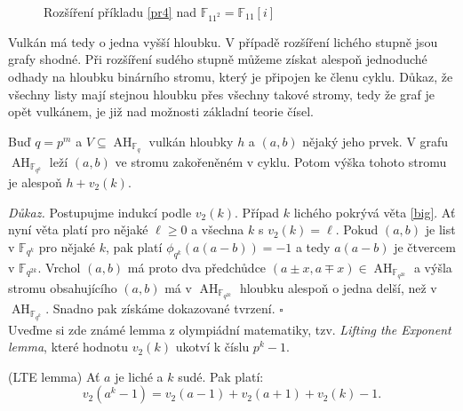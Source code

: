 \documentclass[12pt]{report}
\DeclareMathOperator{\AH}{AH}
\begin{document}
\begin{figure}[!h]
\begin{center}
\end{center}
\caption{Rozšíření příkladu \ref{pr4} nad $\mathbb{F}_{11^2} = \mathbb{F}_{11}[i]$}
\label{sus}
\end{figure}

Vulkán má tedy o jedna vyšší hloubku. V případě rozšíření lichého stupně jsou grafy shodné. Při rozšíření sudého stupně můžeme získat alespoň jednoduché odhady na hloubku binárního stromu, který je připojen ke členu cyklu. Důkaz, že všechny listy mají stejnou hloubku přes všechny takové stromy, tedy že graf je opět vulkánem, je již nad možnosti základní teorie čísel. 

\begin{dusledek}\label{hloub}
Buď $q = p^m$ a $V \subseteq \AH_{\mathbb{F}_q}$ vulkán hloubky $h$ a $(a,b)$ nějaký jeho prvek. V grafu $\AH_{\mathbb{F}_{q^k}}$ leží $(a,b)$ ve stromu zakořeněném v cyklu. Potom výška tohoto stromu je alespoň $h+v_2(k)$.
\end{dusledek}
\noindent \textit{Důkaz.} Postupujme indukcí podle $v_2(k)$. Případ $k$ lichého pokrývá věta \ref{big}. Ať nyní věta platí pro nějaké $\ell \geqslant 0$ a všechna $k$ s $v_2 (k) = \ell$. Pokud $(a,b)$ je list v $\mathbb{F}_{q^k}$ pro nějaké $k$, pak platí $\phi_{q^k} (a(a-b)) = -1$ a tedy $a(a-b)$ je čtvercem v $\mathbb{F}_{q^{2k}}$. Vrchol $(a,b)$ má proto dva předchůdce $(a\pm x,a\mp x) \in \AH_{\mathbb{F}_{q^{2k}}}$  a výšla stromu obsahujícího $(a,b)$ má v $\AH_{\mathbb{F}_{q^{2k}}}$ hloubku alespoň o jedna delší, než v $\AH_{\mathbb{F}_{q^{k}}}$. Snadno pak získáme dokazované tvrzení. \hfill $\square$\\

Uveďme si zde známé lemma z olympiádní matematiky, tzv. \textit{Lifting the Exponent lemma}, které hodnotu $v_2(k)$ ukotví k číslu $p^k - 1$. 
\begin{veta}(LTE lemma)
Ať $a$ je liché a $k$ sudé. Pak platí:
$$v_2 (a^k - 1) = v_2(a-1)+v_2 (a+1) + v_2 (k) - 1.$$
\end{veta}
\end{document}

